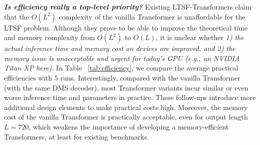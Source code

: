 \documentclass[10pt,twocolumn,letterpaper]{article}
\begin{document}
\begin{table}[h]
\centering
{}
\vspace{-0.2cm}
\caption{The MSE comparison of two training data sizes.}
\vspace{-0.3cm}
\label{tab:shortenTraffic}
\end{table}


\textbf{\emph{Is efficiency really a top-level priority?}}
Existing LTSF-Transformers claim that the $O\left(L^{2}\right)$ complexity of the vanilla Transformer is unaffordable for the LTSF problem. Although they prove to be able to improve the theoretical time and memory complexity from $O\left(L^{2}\right)$ to $O\left(L\right)$, it is unclear whether \emph{1) the actual inference time and memory cost on devices are improved, and 2) the memory issue is unacceptable and urgent for today's GPU (e.g., an NVIDIA Titan XP here).}
In Table ~\ref{tab:efficiency}, we compare the average practical efficiencies with 5 runs. Interestingly, compared with the vanilla Transformer (with the same DMS decoder), most Transformer variants incur similar or even worse inference time and parameters in practice. These follow-ups introduce more additional design elements to make practical costs high. Moreover, the memory cost of the vanilla Transformer is practically acceptable, even for output length $L=720$, which weakens the importance of developing a memory-efficient Transformers, at least for existing benchmarks. 
\end{document}
